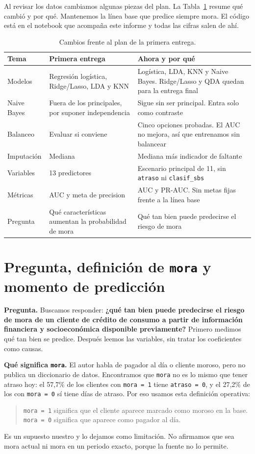\documentclass[11pt]{article}
\begin{document}
Al revisar los datos cambiamos algunas piezas del plan. La Tabla~\ref{tab:cambios} resume qué cambió y por qué. Mantenemos la línea base que predice siempre mora. El código está en el notebook que acompaña este informe y todas las cifras salen de ahí.

\begin{table}[H]
\centering
\caption{Cambios frente al plan de la primera entrega.}
\label{tab:cambios}
\small
\begin{tabular}{@{}p{2.2cm}p{4.2cm}p{6.8cm}@{}}
\toprule
\textbf{Tema} & \textbf{Primera entrega} & \textbf{Ahora y por qué} \\
\midrule
Modelos & Regresión logística, Ridge/Lasso, LDA y KNN & Logística, LDA, KNN y Naive Bayes. Ridge/Lasso y QDA quedan para la entrega final \\
Naive Bayes & Fuera de los principales, por suponer independencia & Sigue sin ser principal. Entra solo como contraste \\
Balanceo & Evaluar si conviene & Cinco opciones probadas. El AUC no mejora, así que entrenamos sin balancear \\
Imputación & Mediana & Mediana más indicador de faltante \\
Variables & 13 predictores & Escenario principal de 11, sin \texttt{atraso} ni \texttt{clasif\_sbs} \\
Métricas & AUC y meta de precision & AUC y PR-AUC. Sin metas fijas frente a la línea base \\
Pregunta & Qué características aumentan la probabilidad de mora & Qué tan bien puede predecirse el riesgo de mora \\
\bottomrule
\end{tabular}
\end{table}

\section{Pregunta, definición de \texttt{mora} y momento de predicción}

\textbf{Pregunta.} Buscamos responder: \textbf{¿qué tan bien puede predecirse el riesgo de mora de un cliente de crédito de consumo a partir de información financiera y socioeconómica disponible previamente?} Primero medimos qué tan bien se predice. Después leemos las variables, sin tratar los coeficientes como causas.

\textbf{Qué significa \texttt{mora}.} El autor habla de pagador al día o cliente moroso, pero no publica un diccionario de datos. Encontramos que \texttt{mora} no es lo mismo que tener atraso hoy: el 57,7\% de los clientes con \texttt{mora = 1} tiene \texttt{atraso = 0}, y el 27,2\% de los con \texttt{mora = 0} sí tiene días de atraso. Por eso usamos esta definición operativa:
\begin{quote}
\texttt{mora = 1} significa que el cliente aparece marcado como moroso en la base. \texttt{mora = 0} significa que aparece como pagador al día.
\end{quote}
Es un supuesto nuestro y lo dejamos como limitación. No afirmamos que sea mora actual ni mora en un periodo exacto, porque la fuente no lo permite.
\end{document}
